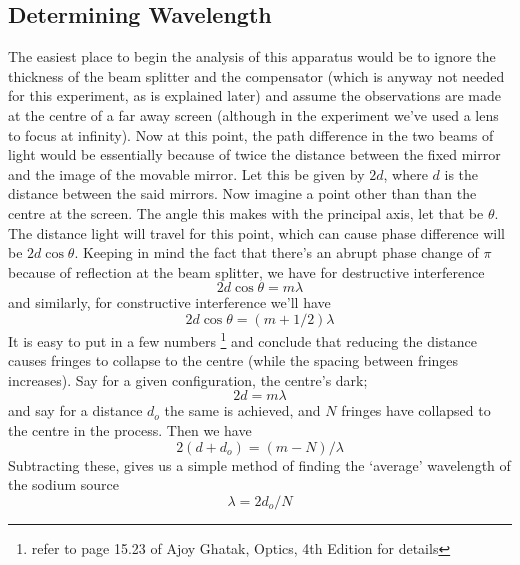 	\subsection{Determining Wavelength}
		The easiest place to begin the analysis of this apparatus would be to ignore the thickness of the beam splitter and the compensator (which is anyway not needed for this experiment, as is explained later) and assume the observations are made at the centre of a far away screen (although in the experiment we've used a lens to focus at infinity). Now at this point, the path difference in the two beams of light would be essentially because of twice the distance between the fixed mirror and the image of the movable mirror. Let this be given by $2d$, where $d$ is the distance between the said mirrors. Now imagine a point other than than the centre at the screen. The angle this makes with the principal axis, let that be $\theta$. The distance light will travel for this point, which can cause phase difference will be $2d \cos{\theta}$. Keeping in mind the fact that there's an abrupt phase change of $\pi$ because of reflection at the beam splitter, we have for destructive interference
		\begin{equation}
			2d\cos{\theta}=m\lambda
		\end{equation}
		and similarly, for constructive interference we'll have
		\begin{equation}
			2d\cos{\theta}=(m+1/2)\lambda
		\end{equation}
		It is easy to put in a few numbers \footnote{refer to page 15.23 of Ajoy Ghatak, Optics, 4th Edition for details} and conclude that reducing the distance causes fringes to collapse to the centre (while the spacing between fringes increases). Say for a given configuration, the centre's dark;
		\begin{equation}
			2d=m\lambda
		\end{equation}
		and say for a distance $d_o$ the same is achieved, and $N$ fringes have collapsed to the centre in the process. Then we have
		\begin{equation}
			2(d+d_o)=(m-N)/\lambda
		\end{equation}
		Subtracting these, gives us a simple method of finding the `average' wavelength of the sodium source
		\begin{equation}
			\lambda=2d_o/N
		\end{equation}


